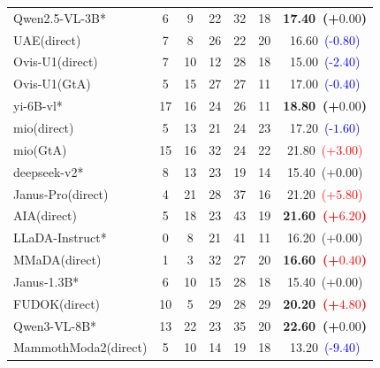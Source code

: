 \documentclass{article}
\providecommand{\rowcolor}[1]{}
\theoremstyle{plain}
\theoremstyle{definition}
\theoremstyle{remark}
\begin{document}
\begin{table}[!htbp]
{\begin{tabular}{@{}lcccccc@{}}
\midrule

\rowcolor{gray!12}
Qwen2.5-VL-3B* & 6 & 9 & 22 & 32 & 18 & \textbf{17.40~(+$0.00$)} \\
UAE(direct) & 7 & 8 & 26 & 22 & 20 & 16.60~\textcolor{blue}{(-$0.80$)} \\
Ovis-U1(direct) & 7 & 10 & 12 & 28 & 18 & 15.00~\textcolor{blue}{(-$2.40$)} \\
Ovis-U1(GtA) & 5 & 15 & 27 & 27 & 11 & 17.00~\textcolor{blue}{(-$0.40$)} \\

\midrule

\rowcolor{gray!12}
yi-6B-vl* & 17 & 16 & 24 & 26 & 11 & \textbf{18.80~(+$0.00$)} \\
mio(direct) & 5 & 13 & 21 & 24 & 23 & 17.20~\textcolor{blue}{(-$1.60$)} \\
mio(GtA) & 15 & 16 & 32 & 24 & 22 & 21.80~\textcolor{red}{(+$3.00$)} \\

\midrule

\rowcolor{gray!12}
deepseek-v2* & 8 & 13 & 23 & 19 & 14 & 15.40~(+$0.00$) \\
Janus-Pro(direct) & 4 & 21 & 28 & 37 & 16 & 21.20~\textcolor{red}{(+$5.80$)} \\
AIA(direct) & 5 & 18 & 23 & 43 & 19 & \textbf{21.60~\textcolor{red}{(+$6.20$)}} \\

\midrule

\rowcolor{gray!12}
LLaDA-Instruct* & 0 & 8 & 21 & 41 & 11 & 16.20~(+$0.00$) \\
MMaDA(direct) & 1 & 3 & 32 & 27 & 20 & \textbf{16.60~\textcolor{red}{(+$0.40$)}} \\

\midrule

\rowcolor{gray!12}
Janus-1.3B* & 6 & 10 & 15 & 28 & 18 & 15.40~(+$0.00$) \\
FUDOK(direct) & 10 & 5 & 29 & 28 & 29 & \textbf{20.20~\textcolor{red}{(+$4.80$)}} \\

\midrule

\rowcolor{gray!12}
Qwen3-VL-8B* & 13 & 22 & 23 & 35 & 20 & \textbf{22.60~(+$0.00$)} \\
MammothModa2(direct) & 5 & 10 & 14 & 19 & 18 & 13.20~\textcolor{blue}{(-$9.40$)} \\


\end{tabular}}
\end{table}
\end{document}
